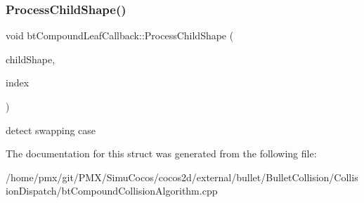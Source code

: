 \subsubsection{\texorpdfstring{Process\+Child\+Shape()}{ProcessChildShape()}}
{\footnotesize\ttfamily void bt\+Compound\+Leaf\+Callback\+::\+Process\+Child\+Shape (\begin{DoxyParamCaption}\item[{const bt\+Collision\+Shape $\ast$}]{child\+Shape,  }\item[{int}]{index }\end{DoxyParamCaption})\hspace{0.3cm}{\ttfamily [inline]}}

detect swapping case 

The documentation for this struct was generated from the following file\+:\begin{DoxyCompactItemize}
\item 
/home/pmx/git/\+P\+M\+X/\+Simu\+Cocos/cocos2d/external/bullet/\+Bullet\+Collision/\+Collision\+Dispatch/bt\+Compound\+Collision\+Algorithm.\+cpp\end{DoxyCompactItemize}
